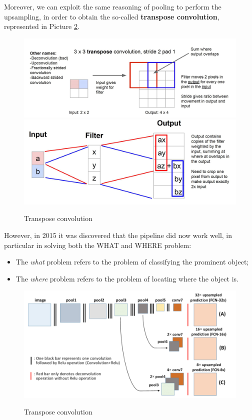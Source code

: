 Moreover, we can exploit the same reasoning of pooling to perform the upsampling, in order to obtain the so-called \textbf{transpose convolution}, represented in Picture \ref{transpose convolution}.

\begin{figure}[h!]
		\centering
        \includegraphics[scale = 1.0]{img/transpose_convolution3.jpg}
        \includegraphics[scale = 0.3]{img/transpose_convolution4.jpg}
		\label{transpose convolution}
        \caption{Transpose convolution}
\end{figure}

However, in 2015 it was discovered that the pipeline did now work well, in particular in solving both the WHAT and WHERE problem:

\begin{itemize}
    \item The \textit{what} problem refers to the problem of classifying the prominent object;
    \item The \textit{where} problem refers to the problem of locating where the object is.
\end{itemize}

\begin{figure}[h!]
		\centering
        \includegraphics[scale = 0.35]{img/transpose_convolution5.jpg}
		\label{transpose convolution}
        \caption{Transpose convolution}
\end{figure}

